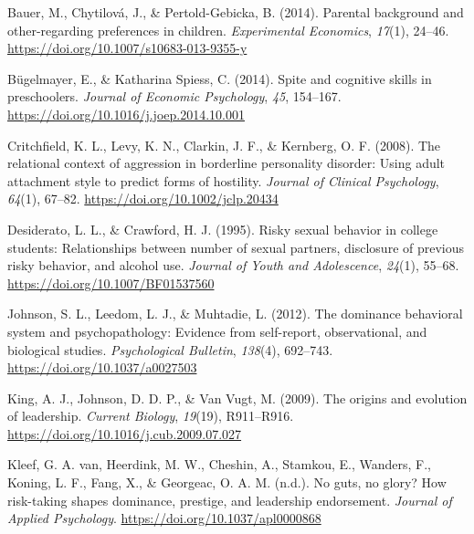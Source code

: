 \documentclass[
  english,
  a4paper]{apa7}
\newlength{\cslhangindent}
\newlength{\cslentryspacingunit} %
\newenvironment{CSLReferences}[2] %
 {%
  \setlength{\parindent}{0pt}
  \ifodd #1
  \let\oldpar\par
  \def\par{\hangindent=\cslhangindent\oldpar}
  \fi
  \setlength{\parskip}{#2\cslentryspacingunit}
 }%
 {}
\begin{document}
\begingroup
\setlength{\parindent}{-0.5in}
\setlength{\leftskip}{0.5in}

\hypertarget{refs}{}
\begin{CSLReferences}{1}{0}
\leavevmode{}%
Bauer, M., Chytilová, J., \& Pertold-Gebicka, B. (2014). Parental background and other-regarding preferences in children. \emph{Experimental Economics}, \emph{17}(1), 24--46. \url{https://doi.org/10.1007/s10683-013-9355-y}

\leavevmode{}%
Bügelmayer, E., \& Katharina Spiess, C. (2014). Spite and cognitive skills in preschoolers. \emph{Journal of Economic Psychology}, \emph{45}, 154--167. \url{https://doi.org/10.1016/j.joep.2014.10.001}

\leavevmode{}%
Critchfield, K. L., Levy, K. N., Clarkin, J. F., \& Kernberg, O. F. (2008). The relational context of aggression in borderline personality disorder: Using adult attachment style to predict forms of hostility. \emph{Journal of Clinical Psychology}, \emph{64}(1), 67--82. \url{https://doi.org/10.1002/jclp.20434}

\leavevmode{}%
Desiderato, L. L., \& Crawford, H. J. (1995). Risky sexual behavior in college students: Relationships between number of sexual partners, disclosure of previous risky behavior, and alcohol use. \emph{Journal of Youth and Adolescence}, \emph{24}(1), 55--68. \url{https://doi.org/10.1007/BF01537560}

\leavevmode{}%
Johnson, S. L., Leedom, L. J., \& Muhtadie, L. (2012). The dominance behavioral system and psychopathology: Evidence from self-report, observational, and biological studies. \emph{Psychological Bulletin}, \emph{138}(4), 692--743. \url{https://doi.org/10.1037/a0027503}

\leavevmode{}%
King, A. J., Johnson, D. D. P., \& Van Vugt, M. (2009). The origins and evolution of leadership. \emph{Current Biology}, \emph{19}(19), R911--R916. \url{https://doi.org/10.1016/j.cub.2009.07.027}

\leavevmode{}%
Kleef, G. A. van, Heerdink, M. W., Cheshin, A., Stamkou, E., Wanders, F., Koning, L. F., Fang, X., \& Georgeac, O. A. M. (n.d.). No guts, no glory? How risk-taking shapes dominance, prestige, and leadership endorsement. \emph{Journal of Applied Psychology}. \url{https://doi.org/10.1037/apl0000868}


\end{CSLReferences}
\end{document}
